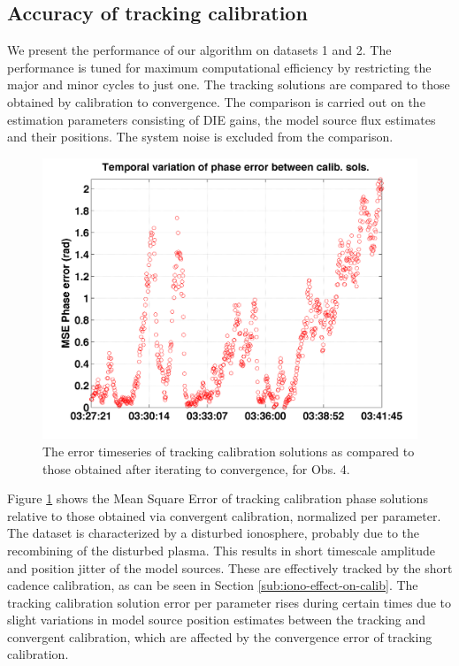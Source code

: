 \documentclass{aa}
\begin{document}
\subsection{Accuracy of tracking calibration}
We present the performance of our algorithm on datasets 1 and 2. The performance
is tuned for maximum computational efficiency by restricting the major and minor
cycles to  just one. The  tracking solutions are  compared to those  obtained by
calibration  to convergence.  The comparison  is carried  out on  the estimation
parameters consisting  of DIE gains, the  model source flux  estimates and their
positions. The system noise is excluded from the comparison.

\begin{figure}[tbh]
\includegraphics[width=1\columnwidth]{Figs/cmpcalsol}
\caption{\label{fig:The-error-timeseries}The error timeseries of tracking
calibration solutions as compared to those obtained after iterating
to convergence, for Obs. 4.}
\end{figure}

Figure \ref{fig:The-error-timeseries}  shows the  Mean Square Error  of tracking
calibration  phase   solutions  relative   to  those  obtained   via  convergent
calibration,  normalized  per parameter.   The  dataset  is  characterized by  a
disturbed  ionosphere,  probably  due   to  the  recombining  of  the  disturbed
plasma. This  results in  short timescale amplitude  and position jitter  of the
model sources.  These are effectively  tracked by the short cadence calibration,
as  can  be  seen   in  Section  \ref{sub:iono-effect-on-calib}.   The  tracking
calibration  solution error  per parameter  rises  during certain  times due  to
slight variations  in model source  position estimates between the  tracking and
convergent calibration, which are affected  by the convergence error of tracking
calibration.
\end{document}
